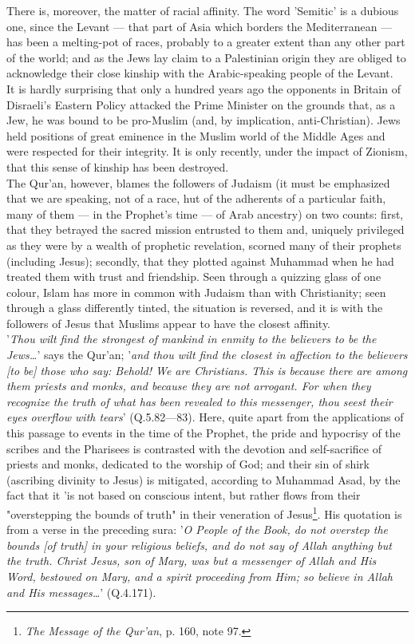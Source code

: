 \documentclass[11pt, b5paper, twoside]{book}
\begin{document}
There is, moreover, the matter of racial affinity. The word 'Semitic' is a dubious one, since the 
Levant --- that part of Asia which borders the Mediterranean --- has been a melting-pot of races, 
probably to a greater extent than any other part of the world; and as the Jews lay claim to a 
Palestinian origin they are obliged to acknowledge their close kinship with the Arabic-speaking 
people of the Levant. \\

It is hardly surprising that only a hundred years ago the opponents in Britain of Disraeli's Eastern 
Policy attacked the Prime Minister on the grounds that, as a Jew, he was bound to be pro-Muslim (and, 
by implication, anti-Christian). Jews held positions of great eminence in the Muslim world of the 
Middle Ages and were respected for their integrity. It is only recently, under the impact of Zionism, 
that this sense of kinship has been destroyed. \\

The Qur'an, however, blames the followers of Judaism (it must be emphasized that we are speaking, not 
of a race, hut of the adherents of a particular faith, many of them --- in the Prophet's time --- of Arab 
ancestry) on two counts: first, that they betrayed the sacred mission entrusted to them and, uniquely 
privileged as they were by a wealth of prophetic revelation, scorned many of their prophets 
(including Jesus); secondly, that they plotted against Muhammad when he had treated them with trust 
and friendship. Seen through a quizzing glass of one colour, Islam has more in common with Judaism 
than with Christianity; seen through a glass differently tinted, the situation is reversed, and it is 
with the followers of Jesus that Muslims appear to have the closest affinity. \\

'\emph{Thou wilt find the strongest of mankind in enmity to the believers to be the Jews\ldots{}}' says the 
Qur'an; '\emph{and thou wilt find the closest in affection to the believers [to be] those who say: Behold! 
We are Christians. This is because there are among them priests and monks, and because they are not 
arrogant. For when they recognize the truth of what has been revealed to this messenger, thou seest 
their eyes overflow with tears}' (Q.5.82---83). Here, quite apart from the applications of this passage 
to events in the time of the Prophet, the pride and hypocrisy of the scribes and the Pharisees is 
contrasted with the devotion and self-sacrifice of priests and monks, dedicated to the worship of 
God; and their sin of shirk (ascribing divinity to Jesus) is mitigated, according to Muhammad Asad, 
by the fact that it 'is not based on conscious intent, but rather flows from their "overstepping the 
bounds of truth" in their veneration of Jesus\footnote{\emph{The Message of the Qur'an}, p. 160, note 97.}. His quotation is from a verse in the preceding sura: '\emph{O People of the Book, do not overstep the bounds [of truth] in your religious beliefs, and do not say of Allah anything but the truth. Christ Jesus, son of Mary, was but a messenger of Allah and His Word, bestowed on Mary, and a spirit proceeding from Him; so believe in Allah and His messages\ldots{}}' (Q.4.171). \\
\end{document}
